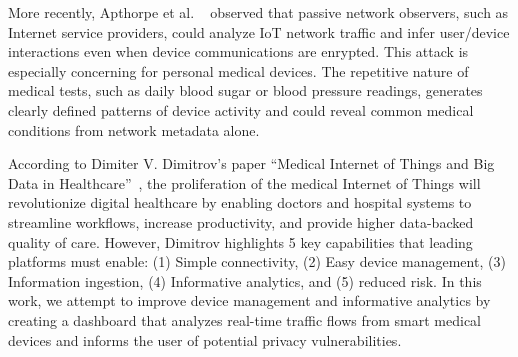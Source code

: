 More recently, Apthorpe et al. ~\cite{apthorpeIoT} observed that passive network observers, such as Internet service providers, could analyze IoT network traffic and infer user/device interactions even when device communications are enrypted. 
This attack is especially concerning for personal medical devices. The repetitive nature of medical tests, such as daily blood sugar or blood pressure readings, generates clearly defined patterns of device activity and could reveal common medical conditions from network metadata alone. 


According to Dimiter V. Dimitrov's paper ``Medical Internet of Things and Big Data in Healthcare''~\cite{dimitrovIoT},
the proliferation of the medical Internet of Things will revolutionize digital healthcare by enabling doctors and hospital systems to streamline workflows, increase productivity, and provide higher data-backed quality of care. However, Dimitrov highlights 5 key capabilities that leading platforms must enable: (1) Simple connectivity, (2) Easy device management, (3) Information ingestion, (4) Informative analytics, and (5) reduced risk. In this work, we attempt to improve device management and informative analytics by creating a dashboard that analyzes real-time traffic flows from smart medical devices and informs the user of potential privacy vulnerabilities.

